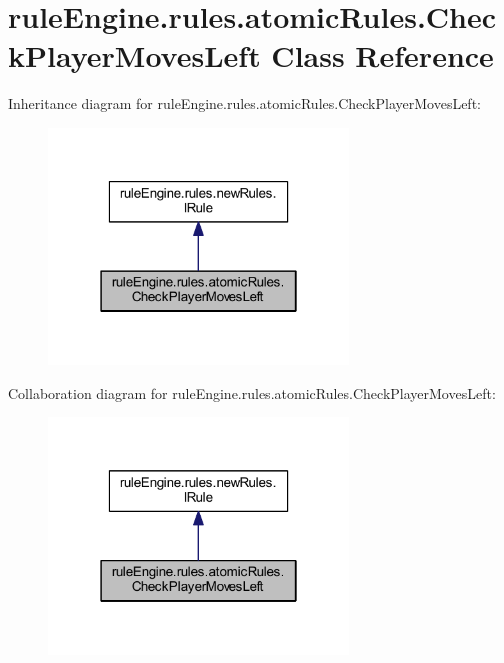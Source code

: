 \hypertarget{classrule_engine_1_1rules_1_1atomic_rules_1_1_check_player_moves_left}{}\section{rule\+Engine.\+rules.\+atomic\+Rules.\+Check\+Player\+Moves\+Left Class Reference}
\label{classrule_engine_1_1rules_1_1atomic_rules_1_1_check_player_moves_left}


Inheritance diagram for rule\+Engine.\+rules.\+atomic\+Rules.\+Check\+Player\+Moves\+Left\+:
\nopagebreak
\begin{figure}[H]
\begin{center}
\leavevmode
\includegraphics[width=226pt]{classrule_engine_1_1rules_1_1atomic_rules_1_1_check_player_moves_left__inherit__graph}
\end{center}
\end{figure}


Collaboration diagram for rule\+Engine.\+rules.\+atomic\+Rules.\+Check\+Player\+Moves\+Left\+:
\nopagebreak
\begin{figure}[H]
\begin{center}
\leavevmode
\includegraphics[width=226pt]{classrule_engine_1_1rules_1_1atomic_rules_1_1_check_player_moves_left__coll__graph}
\end{center}
\end{figure}
